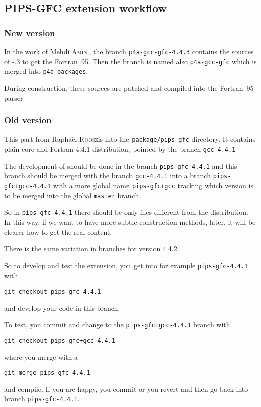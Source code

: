 \documentclass[a4paper]{article}
\begin{document}
\subsection{PIPS-GFC extension workflow}
\label{sec:pips-gfc-workflow}

\subsubsection{New version}
\label{sec:new-version}

In the work of Mehdi \textsc{Amini}, the branch
\texttt{p4a-gcc-gfc-4.4.3} contains the sources of \Agcc-.3 to
get the Fortran~95. Then the branch is named also \texttt{p4a-gcc-gfc}
which is merged into \texttt{p4a-packages}.

During \Apfa construction, these sources are patched and compiled into the
\Apips Fortran~95 parser.


\subsubsection{Old version}
\label{sec:old-version}


This part from Raphaël \textsc{Roosz}is into the \texttt{package/pips-gfc}
directory. It contains plain \Agcc core and Fortran 4.4.1 distribution,
pointed by the branch \texttt{gcc-4.4.1}

The development of \Apipsgfc should be done in the branch
\texttt{pips-gfc-4.4.1} and this branch should be merged with the
branch \texttt{gcc-4.4.1} into a branch \texttt{pips-gfc+gcc-4.4.1} with a
more global name \texttt{pips-gfc+gcc} tracking which version is to be
merged into the global \texttt{master} branch.

So in \texttt{pips-gfc-4.4.1} there should be only files different from
the \Agcc distribution. In this way, if we want to have more subtle
construction methods, later, it will be clearer how to get the real
content.

There is the same variation in branches for version 4.4.2.

So to develop and test the \Apipsgfc extension, you get into for example
\texttt{pips-gfc-4.4.1} with
\begin{verbatim}
git checkout pips-gfc-4.4.1
\end{verbatim}
and develop your code in this branch.

To test, you commit and change to the \texttt{pips-gfc+gcc-4.4.1} branch with
\begin{verbatim}
git checkout pips-gfc+gcc-4.4.1
\end{verbatim}
where you merge with a
\begin{verbatim}
git merge pips-gfc-4.4.1
\end{verbatim}
and compile. If you are happy, you commit or you revert and then go back
into branch \texttt{pips-gfc-4.4.1}.
\end{document}
